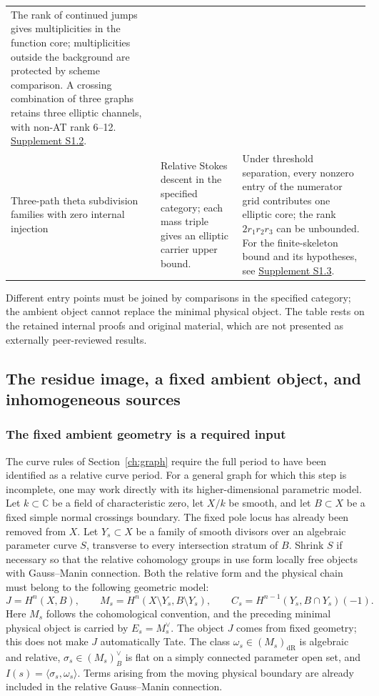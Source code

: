 \documentclass[11pt,a4paper,oneside]{article}
\theoremstyle{plain}
\theoremstyle{definition}
\theoremstyle{remark}
\newcommand{\dR}{\mathrm{dR}}
\numberwithin{equation}{section}
\newcommand{\otherref}[2]{\href{#1.pdf}{#2}}
\begin{document}
\begin{center}
\begin{longtable}{>{\raggedright\arraybackslash}p{29mm}>{\raggedright\arraybackslash}p{51mm}>{\raggedright\arraybackslash}p{61mm}}
The rank of continued jumps gives multiplicities in the function core; multiplicities outside the background are protected by scheme comparison. A crossing combination of three graphs retains three elliptic channels, with non-AT rank 6--12. \otherref{feynman_periods_supplement_en}{Supplement S1.2}.\\
Three-path theta subdivision families with zero internal injection&
Relative Stokes descent in the specified category; each mass triple gives an elliptic carrier upper bound.&
Under threshold separation, every nonzero entry of the numerator grid contributes one elliptic core; the rank $2r_1r_2r_3$ can be unbounded. For the finite-skeleton bound and its hypotheses, see \otherref{feynman_periods_supplement_en}{Supplement S1.3}.\\
\bottomrule
\end{longtable}
\end{center}
Different entry points must be joined by comparisons in the specified category; the ambient object cannot replace the minimal physical object.
The table rests on the retained internal proofs and original material, which are not presented as externally peer-reviewed results.


\subsection{The residue image, a fixed ambient object, and inhomogeneous sources}
\label{unified:sec:pencil}
\subsubsection{The fixed ambient geometry is a required input}
The curve rules of Section~\ref{ch:graph} require the full period to have been identified as a relative curve period.
For a general graph for which this step is incomplete, one may work directly with its higher-dimensional parametric model.
Let $k\subset\mathbb C$ be a field of characteristic zero, let $X/k$ be smooth,
and let $B\subset X$ be a fixed simple normal crossings boundary.
The fixed pole locus has already been removed from $X$.
Let $Y_s\subset X$ be a family of smooth divisors over an algebraic parameter curve $S$,
transverse to every intersection stratum of $B$.
Shrink $S$ if necessary so that the relative cohomology groups in use form locally free objects with Gauss--Manin connection.
Both the relative form and the physical chain must belong to the following geometric model:
\[
 J=H^n(X,B),\qquad
 M_s=H^n(X\setminus Y_s,B\setminus Y_s),\qquad
 C_s=H^{n-1}(Y_s,B\cap Y_s)(-1).
\]
Here $M_s$ follows the cohomological convention, and the preceding minimal physical object is carried by $E_s=M_s^\vee$.
The object $J$ comes from fixed geometry; this does not make $J$ automatically Tate.
The class $\omega_s\in(M_s)_{\dR}$ is algebraic and relative,
$\sigma_s\in(M_s)_B^\vee$ is flat on a simply connected parameter open set,
and $I(s)=\langle\sigma_s,\omega_s\rangle$.
Terms arising from the moving physical boundary are already included in the relative Gauss--Manin connection.
\end{document}
